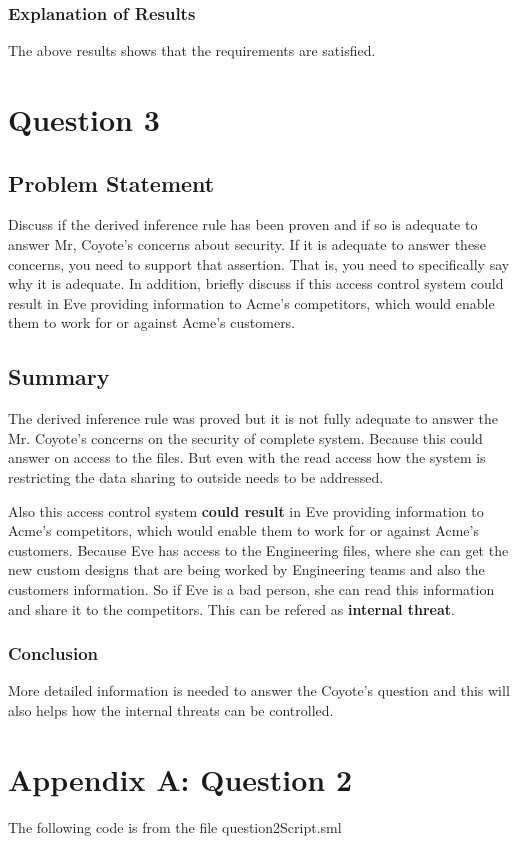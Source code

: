 \documentclass{report}
\begin{document}
\subsection{Explanation of Results}
\label{sec:explanation-results-2}
The above results shows that the requirements are satisfied.



 \chapter{Question 3}
 \label{cha:exercise-3}
  
 \section{Problem Statement}
 \label{sec:problem-statement-3}

 Discuss if the derived inference rule has been proven and if so is
 adequate to answer Mr, Coyote’s concerns about security. If it is
 adequate to answer these concerns, you need to support that
 assertion. That is, you need to specifically say why it is
 adequate. In addition, briefly discuss if this access control system
 could result in Eve providing information to Acme’s competitors,
 which would enable them to work for or against Acme’s customers.

\section{Summary}
\label{sec:summary-3}
The derived inference rule was proved but it is not fully adequate to
answer the Mr. Coyote's concerns on the security of complete system.
Because this could answer on access to the files.  But even with the
read access how the system is restricting the data sharing to outside
needs to be addressed.

Also this access control system \textbf{could result} in Eve providing information to Acme’s
competitors, which would enable them to work for or against Acme’s
customers.  Because Eve has access to the Engineering files, where she
can get the new custom designs that are being worked by Engineering
teams and also the customers information.  So if Eve is a bad person,
she can read this information and share it to the competitors. This
can be refered as \textbf{internal threat}.

\subsection{Conclusion}
\label{sec:conclusion-3}
More detailed information is needed to answer the Coyote's question and this will also helps how the internal threats can be controlled.


\chapter{Appendix A: Question 2}
\label{cha:appendix-a:1}

The following code is from the file question2Script.sml

\end{document}
